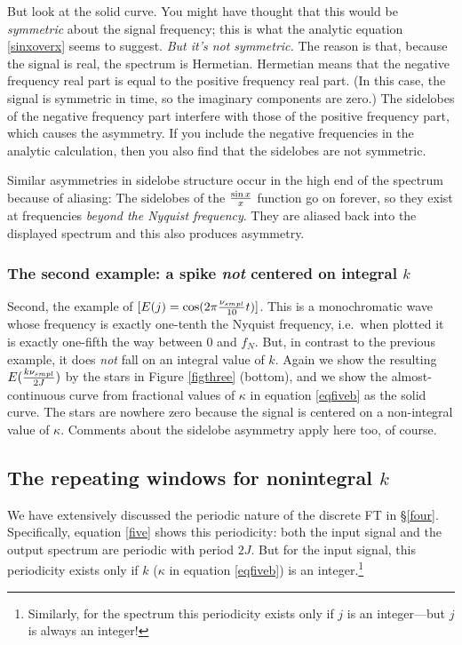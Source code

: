 \documentclass[psfig,preprint]{aastex}
\begin{document}
	But look at the solid curve. You might have thought that this
would be {\it symmetric} about the signal frequency; this is what the
analytic equation \ref{sinxoverx} seems to suggest. {\it But it's not
symmetric.} The reason is that, because the signal is real, the spectrum
is Hermetian. Hermetian means that the negative frequency real part is
equal to the positive frequency real part. (In this case, the signal is
symmetric in time, so the imaginary components are zero.) The sidelobes
of the negative frequency part interfere with those of the positive
frequency part, which causes the asymmetry. If you include the negative
frequencies in the analytic calculation, then you also find that the
sidelobes are not symmetric. 

	Similar asymmetries in sidelobe structure occur in the high end
of the spectrum because of aliasing: The sidelobes of the $\sin x \over
x$ function go on forever, so they exist at frequencies {\it beyond the
Nyquist frequency}. They are aliased back into the displayed spectrum
and this also produces asymmetry.

\subsubsection{The second example: a spike {\it not} centered on
integral $k$}

	Second, the example of $[E(j) = \cos(2 \pi {\nu_{smpl} \over 10}
t)]$. This is a monochromatic wave whose frequency is exactly one-tenth
the Nyquist frequency, i.e.\ when plotted it is exactly one-fifth the
way between 0 and $f_N$. But, in contrast to the previous example, it
does {\it not} fall on an integral value of $k$. Again we show the
resulting $E({k \nu_{smpl} \over 2J})$ by the stars in Figure
\ref{figthree} (bottom), and we show the almost-continuous curve from
fractional values of $\kappa$ in equation \ref{eqfiveb} as the solid
curve. The stars are nowhere zero because the signal is centered on a
non-integral value of $\kappa$. Comments about the sidelobe asymmetry
apply here too, of course. 

\subsection{ The repeating windows for nonintegral $k$}
\label{sectionseven}

	We have extensively discussed the periodic nature of the
discrete FT in \S \ref{four}. Specifically, equation \ref{five} shows
this periodicity: both the input signal and the output spectrum are
periodic with period $2J$. But for the input signal, this periodicity
exists only if $k$ ($\kappa$ in equation \ref{eqfiveb}) is an
integer.\footnote{Similarly, for the spectrum this periodicity exists
only if $j$ is an integer---but $j$ is always an integer!}
\end{document}
